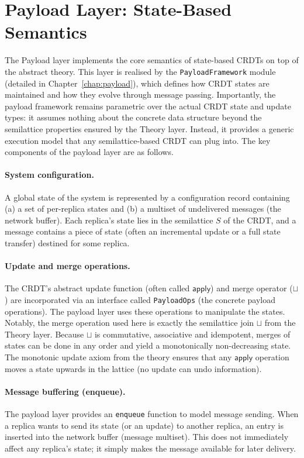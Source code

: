 \section{Payload Layer: State-Based Semantics}
\label{sec:framework-payload}

The Payload layer implements the core semantics of state-based CRDTs on top of the abstract theory. This layer is realised by the \texttt{PayloadFramework} module (detailed in Chapter~\ref{chap:payload}), which defines how CRDT states are maintained and how they evolve through message passing. Importantly, the payload framework remains parametric over the actual CRDT state and update types: it assumes nothing about the concrete data structure beyond the semilattice properties ensured by the Theory layer. Instead, it provides a generic execution model that any semilattice-based CRDT can plug into. The key components of the payload layer are as follows.

\paragraph{System configuration.}
A global state of the system is represented by a configuration record containing (a) a set of per-replica states and (b) a multiset of undelivered messages (the network buffer). Each replica’s state lies in the semilattice $S$ of the CRDT, and a message contains a piece of state (often an incremental update or a full state transfer) destined for some replica.

\paragraph{Update and merge operations.}
The CRDT’s abstract update function (often called $\mathsf{apply}$) and merge operator ($\sqcup$) are incorporated via an interface called \texttt{PayloadOps} (the concrete payload operations). The payload layer uses these operations to manipulate the states. Notably, the merge operation used here is exactly the semilattice join $\sqcup$ from the Theory layer. Because $\sqcup$ is commutative, associative and idempotent, merges of states can be done in any order and yield a monotonically non-decreasing state. The monotonic update axiom from the theory ensures that any $\mathsf{apply}$ operation moves a state upwards in the lattice (no update can undo information).

\paragraph{Message buffering (enqueue).}
The payload layer provides an \texttt{enqueue} function to model message sending. When a replica wants to send its state (or an update) to another replica, an entry is inserted into the network buffer (message multiset). This does not immediately affect any replica’s state; it simply makes the message available for later delivery.

